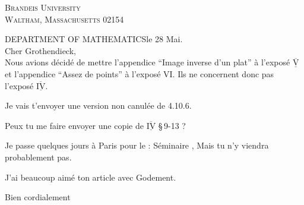 \begin{center}
\textsc{Brandeis University}\\
\textsc{Waltham, Massachusetts 02154}
\end{center}
\noindent DEPARTMENT OF MATHEMATICS\hfill le 28 Mai.\\

Cher Grothendieck,\\

Nous avions décidé de mettre l'appendice ``Image inverse d'un plat'' à l'exposé $\underline{\overline{\mathrm{V}}}$ et l'appendice ``Assez de points'' à l'exposé VI. Ils ne concernent donc pas l'exposé $\underline{\overline{\mathrm{IV}}}$.

Je vais t'envoyer une version non canulée de 4.10.6.

Peux tu me faire envoyer une copie de $\underline{\overline{\mathrm{IV}}}$ \S\,9-13 ?

Je passe quelques jours à Paris pour le :  Séminaire , Mais tu n'y viendra probablement pas.

J'ai beaucoup aimé ton article avec Godement.

\begin{flushright}
Bien cordialement\\
\\
\end{flushright}
